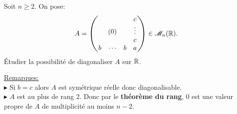 \begin{tcolorbox}
    Soit $n \geqslant 2$. On pose:
    $$
    A = 
        \begin{pmatrix}
              &        &   & c \\
              &  (0)   &   & \vdots \\
              &        &   & c \\
            b & \cdots & b & a
        \end{pmatrix}
        \in \mathscr{M}_n(\mathbb{R}).
    $$
    Étudier la possibilité de diagonaliser $A$ sur $\mathbb{R}$.
\end{tcolorbox}

\underline{Remarques:}\\
$\blacktriangleright$ Si $b = c$ alors $A$ est symétrique réelle donc diagonalisable. \\
$\blacktriangleright$ $A$ est au plus de rang 2. Donc par le \textbf{théorème du rang}, 0 est une valeur propre de $A$ de multiplicité au moins $n-2$.